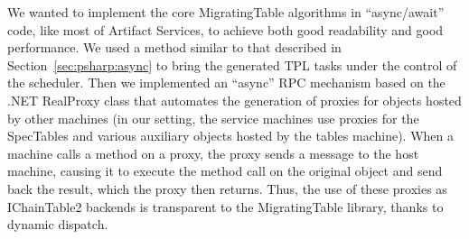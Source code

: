 We wanted to implement the core MigratingTable algorithms in \csharp ``async/await'' code, like most of Artifact Services, to achieve both good readability and good performance.  We used a method similar to that described in Section~\ref{sec:psharp:async} to bring the generated TPL tasks under the control of the \psharp scheduler.  Then we implemented an ``async'' RPC mechanism based on the .NET RealProxy class that automates the generation of proxies for objects hosted by other \psharp machines (in our setting, the service machines use proxies for the SpecTables and various auxiliary objects hosted by the tables machine).  When a machine calls a method on a proxy, the proxy sends a \psharp message to the host machine, causing it to execute the method call on the original object and send back the result, which the proxy then returns.  Thus, the use of these proxies as IChainTable2 backends is transparent to the MigratingTable library, thanks to dynamic dispatch.

